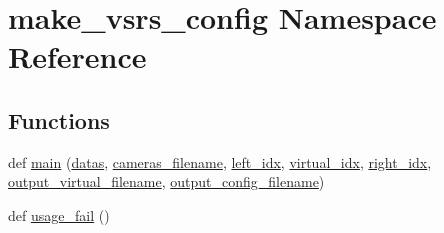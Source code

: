 \hypertarget{namespacemake__vsrs__config}{}\section{make\+\_\+vsrs\+\_\+config Namespace Reference}
\label{namespacemake__vsrs__config}
\subsection*{Functions}
\begin{DoxyCompactItemize}
\item 
def \hyperlink{namespacemake__vsrs__config_a8910faaaa294412f6dce41baa06145a2}{main} (\hyperlink{namespacemake__vsrs__config_aa31562adcb22457c1a02e578e04b07b7}{datas}, \hyperlink{namespacemake__vsrs__config_ac3b756bb1e7859c774b381148fd53d68}{cameras\+\_\+filename}, \hyperlink{namespacemake__vsrs__config_aea06ffd15ffab67d1abe50d4e8c238a0}{left\+\_\+idx}, \hyperlink{namespacemake__vsrs__config_a942abb0bef473b35cee41ba20010380d}{virtual\+\_\+idx}, \hyperlink{namespacemake__vsrs__config_a31b0b1009f32743b1ffc27e78539235b}{right\+\_\+idx}, \hyperlink{namespacemake__vsrs__config_aa243e869e206ff385f9a78dfdf4e2455}{output\+\_\+virtual\+\_\+filename}, \hyperlink{namespacemake__vsrs__config_a10d226e35ee3d383ddb4e32445182d57}{output\+\_\+config\+\_\+filename})
\item 
def \hyperlink{namespacemake__vsrs__config_a411a37954915ca8b5abded854badbffe}{usage\+\_\+fail} ()
\end{DoxyCompactItemize}
